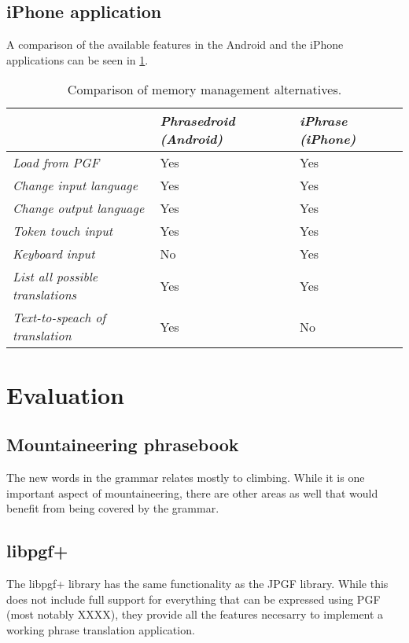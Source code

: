 \subsection{iPhone application}
A comparison of the available features in the Android and the iPhone applications can be seen in \ref{tbl:appcomparison}.
\begin{table}
\begin{center}
\begin{tabular}{|l|l|l|}
	\hline
	 & \emph{Phrasedroid (Android)} & \emph{iPhrase (iPhone)} \\ \hline
	\emph{Load from PGF} & Yes & Yes \\ \hline
	\emph{Change input language} & Yes & Yes \\ \hline
	\emph{Change output language} & Yes & Yes \\ \hline
	\emph{Token touch input} & Yes & Yes \\ \hline
	\emph{Keyboard input} & No & Yes \\ \hline
	\emph{List all possible translations} & Yes & Yes \\ \hline
	\emph{Text-to-speach of translation} & Yes & No \\ \hline
\end{tabular}
\end{center}
\caption{Comparison of memory management alternatives.}
\label{tbl:appcomparison}
\end{table}


\section{Evaluation}


\subsection{Mountaineering phrasebook}
The new words in the grammar relates mostly to climbing. While it is one important aspect of mountaineering, there are other areas as well that would benefit from being covered by the grammar.

\subsection{libpgf+}
The libpgf+ library has the same functionality as the JPGF library. While this does not include full support for everything that can be expressed using PGF (most notably XXXX), they provide all the features necesarry to implement a working phrase translation application.

